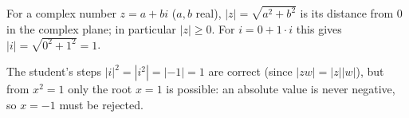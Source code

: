For a complex number $z=a+bi$ ($a,b$ real), $|z|=\sqrt{a^2+b^2}$ is its distance from $0$ in the complex plane; in particular $|z|\ge0$. For $i=0+1\cdot i$ this gives $|i|=\sqrt{0^2+1^2}=\boxed{1}$.

The student's steps $|i|^2=|i^2|=|-1|=1$ are correct (since $|zw|=|z||w|$), but from $x^2=1$ only the root $x=1$ is possible: an absolute value is never negative, so $x=-1$ must be rejected.
